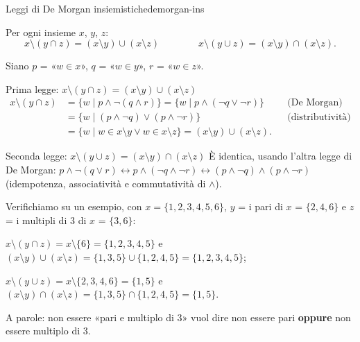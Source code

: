 \begin{concetto}
\begin{Proposizione}{Leggi di De Morgan insiemistiche}{demorgan-ins}
    \begin{prerequisiti}
    \end{prerequisiti}
    Per ogni insieme $x$, $y$, $z$:
    \[ x \setminus (y \cap z) = (x \setminus y) \cup (x \setminus z) \qquad\qquad x \setminus (y \cup z) = (x \setminus y) \cap (x \setminus z). \]
\end{Proposizione}
\begin{dimostrazione}
    Siano $p$ = «$w \in x$», $q$ = «$w \in y$», $r$ = «$w \in z$».
    \begin{caso}{Prima legge: $x \setminus (y \cap z) = (x \setminus y) \cup (x \setminus z)$}
    \[
    \begin{aligned}
        x \setminus (y \cap z) &= \{w \mid p \wedge \neg(q \wedge r)\} = \{w \mid p \wedge (\neg q \vee \neg r)\} && \text{(De Morgan)}\\
        &= \{w \mid (p \wedge \neg q) \vee (p \wedge \neg r)\} && \text{(distributività)}\\
        &= \{w \mid w \in x \setminus y \vee w \in x \setminus z\} = (x \setminus y) \cup (x \setminus z).
    \end{aligned}
    \]
    \end{caso}
    \begin{caso}{Seconda legge: $x \setminus (y \cup z) = (x \setminus y) \cap (x \setminus z)$}
    È identica, usando l'altra legge di De Morgan: $p \wedge \neg(q \vee r) \leftrightarrow p \wedge (\neg q \wedge \neg r)
    \leftrightarrow (p \wedge \neg q) \wedge (p \wedge \neg r)$ (idempotenza, associatività e commutatività di $\wedge$).
    \end{caso}
\end{dimostrazione}
\end{concetto}

\begin{spiegazione}
    Verifichiamo su un esempio, con $x = \{1, 2, 3, 4, 5, 6\}$, $y$ = i pari di $x$ = $\{2, 4, 6\}$ e $z$ = i multipli di $3$ di $x$ = $\{3, 6\}$:
    \begin{passi}
        \item $x \setminus (y \cap z) = x \setminus \{6\} = \{1, 2, 3, 4, 5\}$ e $(x \setminus y) \cup (x \setminus z) = \{1, 3, 5\} \cup \{1, 2, 4, 5\} = \{1, 2, 3, 4, 5\}$;
        \item $x \setminus (y \cup z) = x \setminus \{2, 3, 4, 6\} = \{1, 5\}$ e $(x \setminus y) \cap (x \setminus z) = \{1, 3, 5\} \cap \{1, 2, 4, 5\} = \{1, 5\}$.
    \end{passi}
    A parole: non essere «pari e multiplo di $3$» vuol dire non essere pari \textbf{oppure} non essere multiplo di $3$.
\end{spiegazione}


